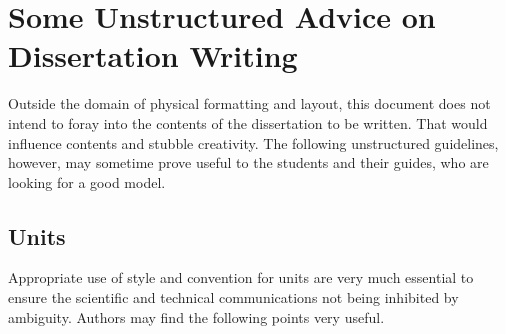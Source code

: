 \chapter{Some Unstructured Advice on Dissertation Writing}\label{Unstructured}
Outside the domain of physical formatting and layout, this document does not intend to foray into the contents of the dissertation to be written. That would influence contents and stubble creativity. The following unstructured guidelines, however, may sometime prove useful to the students and their guides, who are looking for a good model.
\section{Units}
Appropriate use of style and convention for units are very much essential to ensure the scientific and technical communications not being inhibited by ambiguity. Authors may find the following points very useful.
